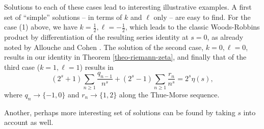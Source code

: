 \documentclass[12pt,reqno]{article}
\begin{document}
Solutions to each of these cases lead to interesting illustrative examples. A first set of ``simple'' solutions -- in terms of $k$ and $\ell$ only -- are easy to find. For the case (1) above, we have $k=\frac12, \ell=-\frac12$, which leads to the classic Woods-Robbins product by differentiation of the resulting series identity at $s=0$, as already noted by Allouche and Cohen \cite{AlloucheCohen85}. The solution of the second case, $k=0, \ell=0$, results in our identity in Theorem \ref{theo-riemann-zeta}, and finally that of the third case ($k=1, \ell=1$) results in
$$
(2^s+1) \sum_{n\geq1} \frac{q_{n-1}}{n^s} + (2^s-1) \sum_{n\geq1} \frac{r_n}{n^s} = 2^s \eta(s),
$$
where $q_n \to \{-1,0\}$ and $r_n \to \{1,2\}$ along the Thue-Morse sequence.

Another, perhaps more interesting set of solutions can be found by taking $s$ into account as well.
\end{document}
